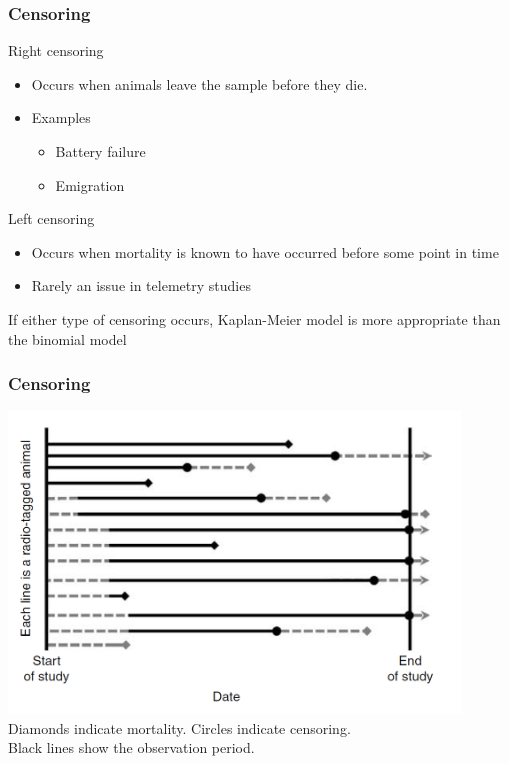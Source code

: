 \documentclass[color=usenames,dvipsnames]{beamer}\usepackage[]{graphicx}\usepackage[]{color}
\begin{document}
\begin{frame}
  \frametitle{Censoring}
  {\large %
    Right censoring} 
  \begin{itemize}
    \normalsize
    \item Occurs when animals leave the sample before they die.
    \item Examples
    \begin{itemize}
      \item Battery failure
      \item Emigration
    \end{itemize}
  \end{itemize}
  \pause
  {\large %
    Left censoring}
  \begin{itemize}
    \normalsize
    \item Occurs when mortality is known to have occurred before some
      point in time
    \item Rarely an issue in telemetry studies
  \end{itemize}
  \pause
  \vfill
  {\centering If either type of censoring occurs, 
    Kaplan-Meier model is more appropriate than the binomial model \par}
\end{frame}



\begin{frame}
  \frametitle{Censoring}
  \centering
  \includegraphics[width=0.9\textwidth]{figs/censoring} \\
  Diamonds indicate mortality. Circles indicate censoring. \\
  Black lines show the observation period. \\ %
\end{frame}
\end{document}
